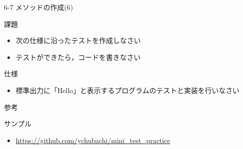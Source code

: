 \documentclass[t, aspectratio=169]{beamer}
\begin{document}
\begin{frame}[label=sec-6-4-7]{6-7 メソッドの作成(6)}
\begin{block}{課題}
\begin{itemize}
\item 次の仕様に沿ったテストを作成しなさい
\item テストができたら，コードを書きなさい
\end{itemize}
\end{block}
\begin{block}{仕様}
\begin{itemize}
\item 標準出力に「Hello」と表示するプログラムのテストと実装を行いなさい
\end{itemize}
\end{block}
\end{frame}

\begin{frame}[label=sec-6-4-8]{参考}
\begin{block}{サンプル}
\begin{itemize}
\item \url{https://github.com/ychubachi/mini_test_practice}
\end{itemize}
\end{block}
\end{frame}
\end{document}
